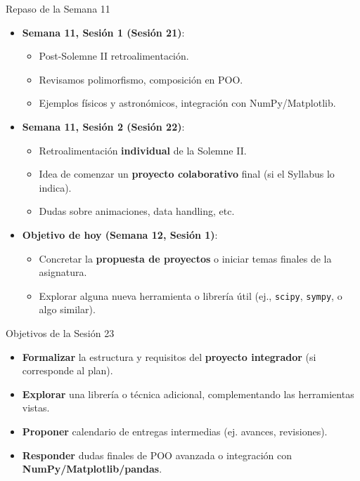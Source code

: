 \documentclass[10pt]{beamer}
\begin{document}
\begin{frame}{Repaso de la Semana 11}
  \begin{itemize}
    \item \textbf{Semana 11, Sesión 1 (Sesión 21)}:
      \begin{itemize}
        \item Post-Solemne II retroalimentación.
        \item Revisamos polimorfismo, composición en POO.
        \item Ejemplos físicos y astronómicos, integración con NumPy/Matplotlib.
      \end{itemize}
    \item \textbf{Semana 11, Sesión 2 (Sesión 22)}:
      \begin{itemize}
        \item Retroalimentación \textbf{individual} de la Solemne II.
        \item Idea de comenzar un \textbf{proyecto colaborativo} final (si el Syllabus lo indica).
        \item Dudas sobre animaciones, data handling, etc.
      \end{itemize}
    \item \textbf{Objetivo de hoy (Semana 12, Sesión 1)}:
      \begin{itemize}
        \item Concretar la \textbf{propuesta de proyectos} o iniciar temas finales de la asignatura.
        \item Explorar alguna nueva herramienta o librería útil (ej., \texttt{scipy}, \texttt{sympy}, o algo similar).
      \end{itemize}
  \end{itemize}
\end{frame}

\begin{frame}{Objetivos de la Sesión 23}
  \begin{itemize}
    \item \textbf{Formalizar} la estructura y requisitos del \textbf{proyecto integrador} (si corresponde al plan).
    \item \textbf{Explorar} una librería o técnica adicional, complementando las herramientas vistas.
    \item \textbf{Proponer} calendario de entregas intermedias (ej. avances, revisiones).
    \item \textbf{Responder} dudas finales de POO avanzada o integración con \textbf{NumPy/Matplotlib/pandas}.
  \end{itemize}
\end{frame}
\end{document}
